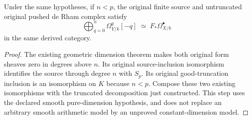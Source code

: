 \begin{corollary}
\label{cor:di-actual-witt-full-decomposition}
\leanok
{}
Under the same hypotheses, if $n<p$, the original finite source and
untruncated original pushed de Rham complex satisfy
\[
 \bigoplus_{q=0}^{n}\Omega^q_{Y/k}[-q]
   \;\simeq\;F_*\Omega^\bullet_{X/k}
\]
in the same derived category.
\end{corollary}
\begin{proof}
\leanok
The existing geometric dimension theorem makes both original form
sheaves zero in degrees above $n$. Its original source-inclusion
isomorphism identifies the source through degree $n$ with $S_p$.
Its original good-truncation inclusion is an isomorphism on $K$ because
$n<p$. Compose these two existing isomorphisms with the truncated
decomposition just constructed. This step uses the declared smooth
pure-dimension hypothesis, and does not replace an arbitrary smooth
arithmetic model by an unproved constant-dimension model.
\end{proof}
